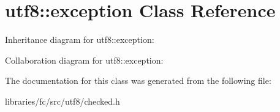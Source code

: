 \hypertarget{classutf8_1_1exception}{}\section{utf8\+:\+:exception Class Reference}
\label{classutf8_1_1exception}


Inheritance diagram for utf8\+:\+:exception\+:


Collaboration diagram for utf8\+:\+:exception\+:


The documentation for this class was generated from the following file\+:\begin{DoxyCompactItemize}
\item 
libraries/fc/src/utf8/checked.\+h\end{DoxyCompactItemize}
